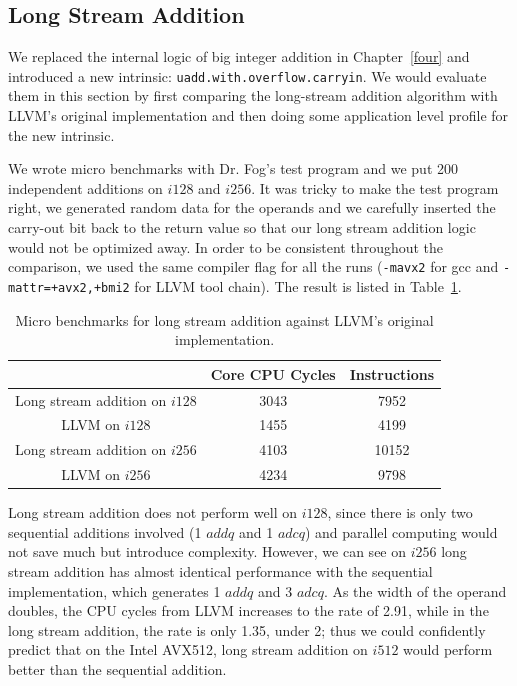 \subsection{Long Stream Addition}
We replaced the internal logic of big integer addition in Chapter~\ref{four} and introduced a new intrinsic: {\tt uadd.with.overflow.carryin}. We would evaluate them in this section by first comparing the long-stream addition algorithm with LLVM's original implementation and then doing some application level profile for the new intrinsic.

We wrote micro benchmarks with Dr. Fog's test program and we put 200 independent additions on $i128$ and $i256$. It was tricky to make the test program right, we generated random data for the operands and we carefully inserted the carry-out bit back to the return value so that our long stream addition logic would not be optimized away. In order to be consistent throughout the comparison, we used the same compiler flag for all the runs ({\tt -mavx2} for gcc and {\tt -mattr=+avx2,+bmi2} for LLVM tool chain). The result is listed in Table~\ref{table:lsadd_micro}.

\begin{table}[h]
\centering
\begin{tabular}{|c|c|c|}
\hline
                             & Core CPU Cycles & Instructions \\ \hline
Long stream addition on $i128$ & 3043            & 7952         \\ \hline
LLVM on $i128$                 & 1455            & 4199         \\ \hline
Long stream addition on $i256$ & 4103            & 10152        \\ \hline
LLVM on $i256$                 & 4234            & 9798         \\ \hline
\end{tabular}
\caption{Micro benchmarks for long stream addition against LLVM's original implementation.}
\label{table:lsadd_micro}
\end{table}

Long stream addition does not perform well on $i128$, since there is only two sequential additions involved (1 $addq$ and 1 $adcq$) and parallel computing would not save much but introduce complexity. However, we can see on $i256$ long stream addition has almost identical performance with the sequential implementation, which generates 1 $addq$ and 3 $adcq$. As the width of the operand doubles, the CPU cycles from LLVM increases to the rate of 2.91, while in the long stream addition, the rate is only 1.35, under 2; thus we could confidently predict that on the Intel AVX512, long stream addition on $i512$ would perform better than the sequential addition.

